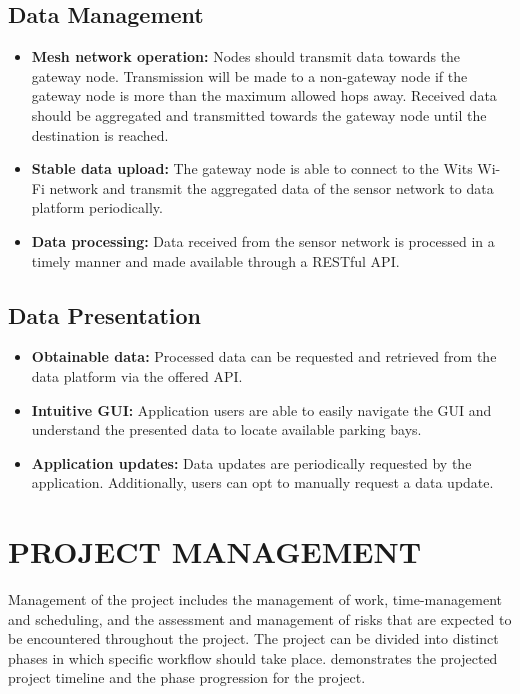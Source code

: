 \documentclass[10pt,twocolumn]{witseiepaper}
\begin{document}
	\subsection{Data Management}
		\begin{itemize}
			\item \textbf{Mesh network operation:} Nodes should transmit data towards the gateway node. Transmission will be made to a non-gateway node if the gateway node is more than the maximum allowed hops away. Received data should be aggregated and transmitted towards the gateway node until the destination is reached.
			\vspace{1em}
			\item  \textbf{Stable data upload:} The gateway node is able to connect to the Wits Wi-Fi network and transmit the aggregated data of the sensor network to data platform periodically.
			\vspace{1em}
			\item \textbf{Data processing:} Data received from the sensor network is processed in a timely manner and made available through a RESTful API.
		\end{itemize}
	
	\subsection{Data Presentation}
		\begin{itemize}
			\item \textbf{Obtainable data:} Processed data can be requested and retrieved from the data platform via the offered API.
			\vspace{1em}
			\item \textbf{Intuitive GUI:} Application users are able to easily navigate the GUI and understand the presented data to locate available parking bays.
			\vspace{1em}
			\item \textbf{Application updates:} Data updates are periodically requested by the application. Additionally, users can opt to manually request a data update.
		\end{itemize}

\section{PROJECT MANAGEMENT}

	Management of the project includes the management of work, time-management and scheduling, and the assessment and management of risks that are expected to be encountered throughout the project. The project can be divided into distinct phases in which specific workflow should take place.  demonstrates the projected project timeline and the phase progression for the project.
	
\end{document}
